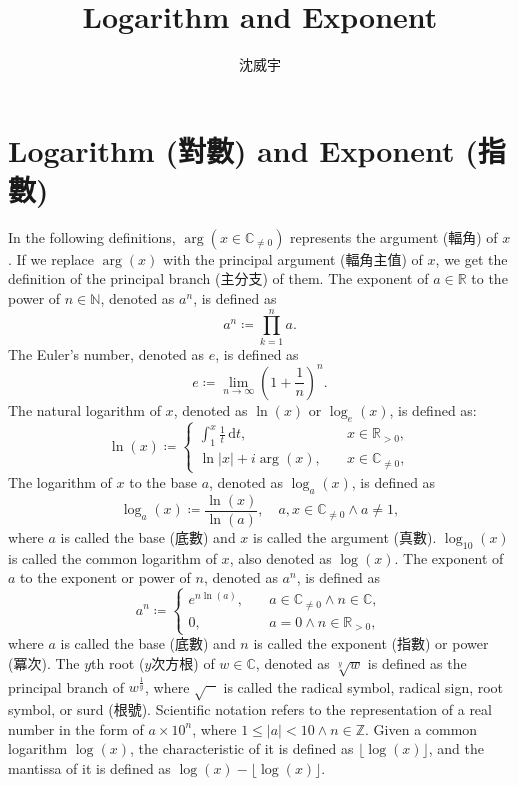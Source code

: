 \documentclass[a4paper,12pt]{article}
\begin{document}
\title{Logarithm and Exponent}
\author{沈威宇}
\date{\temtoday}
\titletocdoc
\section{Logarithm (對數) and Exponent (指數)}
In the following definitions, $\arg(x\in\mathbb{C}_{\neq 0})$ represents the argument (輻角) of $x$. If we replace $\arg(x)$ with the principal argument (輻角主值) of $x$, we get the definition of the principal branch (主分支) of them.
The exponent of $a\in\mathbb{R}$ to the power of $n\in\mathbb{N}$, denoted as $a^n$, is defined as
\[a^n\coloneq\prod_{k=1}^na.\]
The Euler's number, denoted as $e$, is defined as
\[e\coloneq\lim_{n\to\infty}\left(1+\frac{1}{n}\right)^n.\]
The natural logarithm of $x$, denoted as $\ln(x)$ or $\log_e(x)$, is defined as:
\[\ln(x)\coloneq\begin{cases}
\int_1^x\frac{1}{t}\,\mathrm{d}t,\quad & x\in\mathbb{R}_{>0},\\
\ln|x|+i\arg(x),\quad & x\in\mathbb{C}_{\neq 0},
\end{cases}\]
The logarithm of $x$ to the base $a$, denoted as $\log_a(x)$, is defined as
\[\log_a(x)\coloneq\frac{\ln(x)}{\ln(a)},\quad a,x\in\mathbb{C}_{\neq 0}\land a\neq 1,\]
where $a$ is called the base (底數) and $x$ is called the argument (真數).
$\log_{10}(x)$ is called the common logarithm of $x$, also denoted as $\log(x)$.
The exponent of $a$ to the exponent or power of $n$, denoted as $a^n$, is defined as
\[a^n\coloneq\begin{cases}
e^{n\ln(a)},\quad & a\in\mathbb{C}_{\neq 0}\land n\in\mathbb{C},\\
0,\quad & a=0\land n\in\mathbb{R}_{>0},
\end{cases}\]
where $a$ is called the base (底數) and $n$ is called the exponent (指數) or power (冪次).
The $y$th root ($y$次方根) of $w\in\mathbb{C}$, denoted as $\sqrt[y]{w}$ is defined as the principal branch of $w^{\frac{1}{y}}$, where $\sqrt{\phantom{w}}$ is called the radical symbol, radical sign, root symbol, or surd (根號).
Scientific notation refers to the representation of a real number in the form of $a\times 10^n$, where $1\leq |a|<10\land n\in\mathbb{Z}$.
Given a common logarithm $\log(x)$, the characteristic of it is defined as $\lfloor\log(x)\rfloor$, and the mantissa of it is defined as $\log(x)-\lfloor\log(x)\rfloor$.
\end{document}
